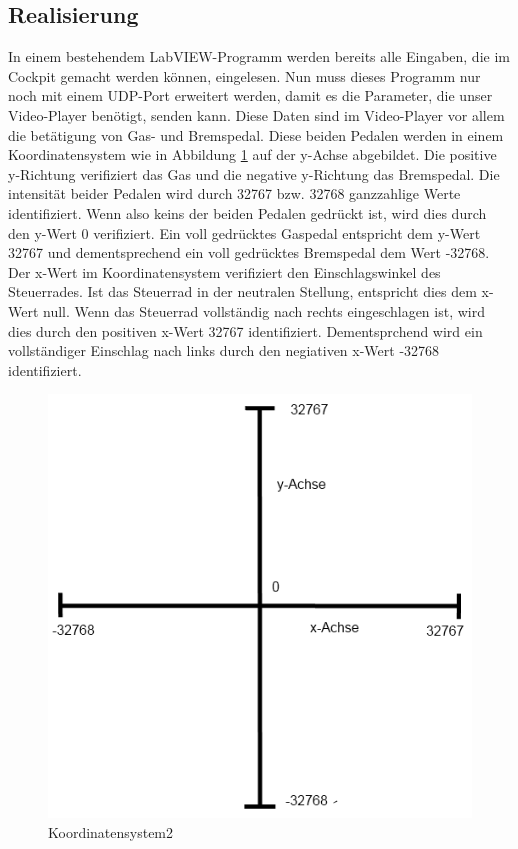 \subsection{Realisierung}
In einem bestehendem LabVIEW-Programm werden bereits alle Eingaben, die im Cockpit gemacht werden können, eingelesen. Nun muss dieses Programm nur noch mit einem UDP-Port erweitert werden, damit es die Parameter, die unser Video-Player benötigt, senden kann. Diese Daten sind im Video-Player vor allem die betätigung von Gas- und Bremspedal. Diese beiden Pedalen werden in einem Koordinatensystem wie in Abbildung \ref{Koordinatensystem2} auf der y-Achse abgebildet. Die positive y-Richtung verifiziert das Gas und die negative y-Richtung das Bremspedal. Die intensität beider Pedalen wird durch 32767 bzw. 32768 ganzzahlige Werte identifiziert. Wenn also keins der beiden Pedalen gedrückt ist, wird dies durch den y-Wert 0 verifiziert. Ein voll gedrücktes Gaspedal entspricht dem y-Wert 32767 und dementsprechend ein voll gedrücktes Bremspedal dem Wert -32768. Der x-Wert im Koordinatensystem verifiziert den Einschlagswinkel des Steuerrades. Ist das Steuerrad in der neutralen Stellung, entspricht dies dem x-Wert null. Wenn das Steuerrad vollständig nach rechts eingeschlagen ist, wird dies durch den positiven x-Wert 32767 identifiziert. Dementsprchend wird ein vollständiger Einschlag nach links durch den negiativen x-Wert -32768 identifiziert. \\

\begin{figure}[H]
\centering 
\includegraphics[scale=0.5]{src/koordinatensystem.png}
\caption{Koordinatensystem2} %
\label{Koordinatensystem2} %
\end{figure}


